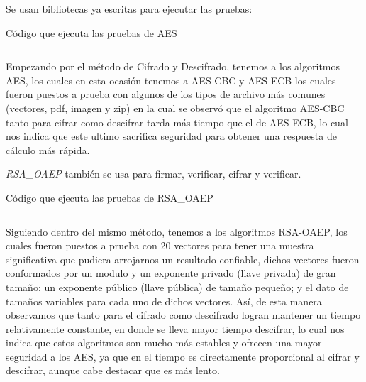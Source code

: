 \documentclass[../main.tex]{subfiles}
\begin{document}
Se usan bibliotecas ya escritas para ejecutar las pruebas:
\begin{code}
  \caption{Código que ejecuta las pruebas de AES}\label{sec:cifrado-y-descifrado-1}
  \inputminted[lastline=81]{python}{../src/test_algoritmos_crypto/AESTests.py}
\end{code}

\clearpage{}

Empezando por el método de Cifrado y Descifrado, tenemos a los algoritmos AES, los cuales en esta ocasión tenemos a AES-CBC y AES-ECB los cuales fueron puestos a prueba con algunos de los tipos de archivo más comunes (vectores, pdf, imagen y zip) en la cual se observó que el algoritmo AES-CBC tanto para cifrar como descifrar tarda más tiempo que el de AES-ECB, lo cual nos indica que este ultimo sacrifica seguridad para obtener una respuesta de cálculo más rápida.

\textit{RSA\_OAEP} también se usa para firmar, verificar, cifrar y verificar.
\begin{code}
  \caption{Código que ejecuta las pruebas de RSA\_OAEP}\label{sec:cifrado-y-descifrado-2}
  \inputminted[lastline=64]{python}{../src/test_algoritmos_crypto/RSAOAEPTest.py}
\end{code}

Siguiendo dentro del mismo método, tenemos a los algoritmos RSA-OAEP, los cuales fueron puestos a prueba con 20 vectores para tener una muestra significativa que pudiera arrojarnos un resultado confiable, dichos vectores fueron conformados por un modulo y un exponente privado (llave privada) de gran tamaño; un exponente público (llave pública) de tamaño pequeño; y el dato de tamaños variables para cada uno de dichos vectores. Así, de esta manera observamos que tanto para el cifrado como descifrado logran mantener un tiempo relativamente constante, en donde se lleva mayor tiempo descifrar, lo cual nos indica que estos algoritmos son mucho más estables y ofrecen una mayor seguridad a los AES, ya que en el tiempo es directamente proporcional al cifrar y descifrar, aunque cabe destacar que es más lento.
\end{document}
